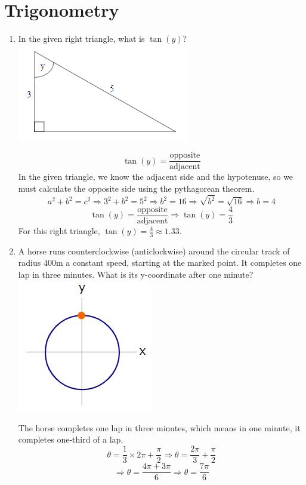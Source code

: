 \documentclass{article}
\begin{document}
\section{Trigonometry}
\begin{enumerate}
\item In the given right triangle, what is $\tan(y)$?
\\\includegraphics[scale = 1]{Images/Trig1.png}

\[\tan(y) = \frac{\text{opposite}}{\text{adjacent}}\]
In the given triangle, we know the adjacent side and the hypotenuse, so we must calculate
the opposite side using the pythagorean theorem.
\[a^{2} + b^{2} = c^{2} \Longrightarrow 3^{2} + b^{2} = 5^{2} \Longrightarrow b^{2} = 16
    \Longrightarrow \sqrt{b^{2}} = \sqrt{16} \Longrightarrow b = 4\]
\[\tan(y) = \frac{\text{opposite}}{\text{adjacent}} \Longrightarrow \tan(y) = \frac{4}{3}\]
For this right triangle, $\tan(y) = \frac{4}{3} \approx 1.33$.

\pagebreak
\item A horse runs counterclockwise (anticlockwise) around the circular track of radius $400$m
a constant speed, starting at the marked point. It completes one lap in three minutes. What is
its y-coordinate after one minute?
\\\includegraphics[scale = 1]{Images/Trig2.png}

The horse completes one lap in three minutes, which means in one minute, it completes
one-third of a lap.
\[\theta = \frac{1}{3}\times 2\pi + \frac{\pi}{2}
    \Longrightarrow \theta = \frac{2\pi}{3} + \frac{\pi}{2}\]
\[\Longrightarrow \theta = \frac{4\pi + 3\pi}{6}
    \Longrightarrow \theta = \frac{7\pi}{6}\]


\end{enumerate}
\end{document}
